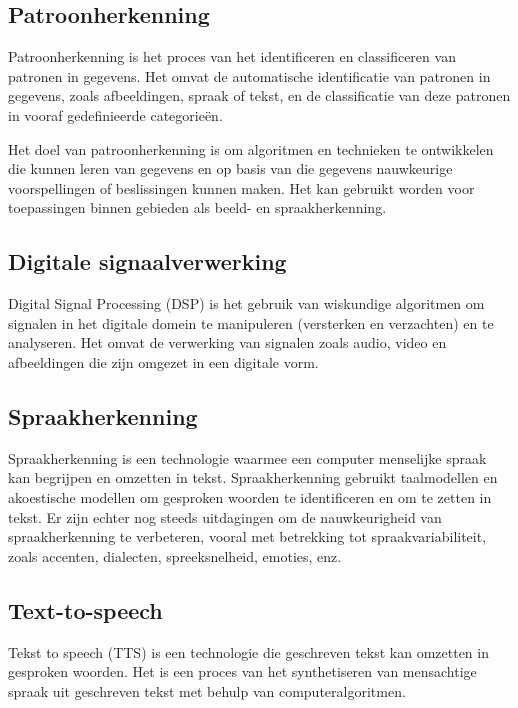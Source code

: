 \cite{hogan2021knowledge}

\subsection{Patroonherkenning}

Patroonherkenning is het proces van het identificeren en classificeren van patronen in gegevens. Het omvat de automatische identificatie van patronen in gegevens, zoals afbeeldingen, spraak of tekst, en de classificatie van deze patronen in vooraf gedefinieerde categorieën. 

Het doel van patroonherkenning is om algoritmen en technieken te ontwikkelen die kunnen leren van gegevens en op basis van die gegevens nauwkeurige voorspellingen of beslissingen kunnen maken. Het kan gebruikt worden voor toepassingen binnen gebieden als beeld- en spraakherkenning.

\cite{basu2010use}

\subsection{Digitale signaalverwerking}

Digital Signal Processing (DSP) is het gebruik van wiskundige algoritmen om signalen in het digitale domein te manipuleren (versterken en verzachten) en te analyseren. Het omvat de verwerking van signalen zoals audio, video en afbeeldingen die zijn omgezet in een digitale vorm.

\cite{vaseghi2008advanced}

\subsection{Spraakherkenning}

Spraakherkenning is een technologie waarmee een computer menselijke spraak kan begrijpen en omzetten in tekst. Spraakherkenning gebruikt taalmodellen en akoestische modellen om gesproken woorden te identificeren en om te zetten in tekst. Er zijn echter nog steeds uitdagingen om de nauwkeurigheid van spraakherkenning te verbeteren, vooral met betrekking tot spraakvariabiliteit, zoals accenten, dialecten, spreeksnelheid, emoties, enz.

\cite{benzeghiba2007automatic}

\subsection{Text-to-speech}

Tekst to speech (TTS) is een technologie die geschreven tekst kan omzetten in gesproken woorden. Het is een proces van het synthetiseren van mensachtige spraak uit geschreven tekst met behulp van computeralgoritmen.

\cite{ren2019fastspeech}

